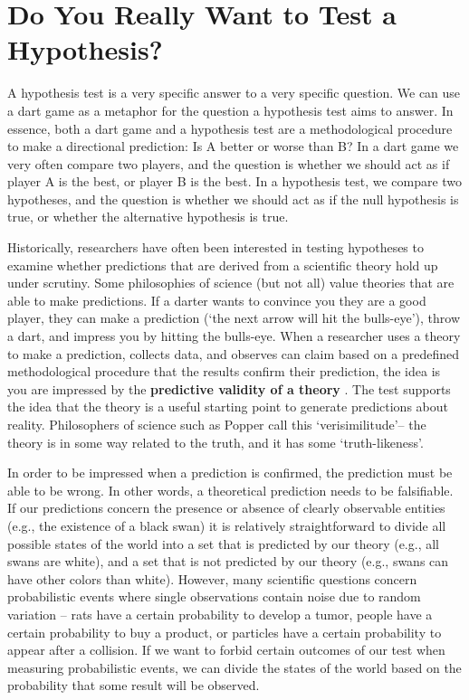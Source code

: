 \documentclass[
  oneside]{krantz}
\begin{document}
\hypertarget{do-you-really-want-to-test-a-hypothesis}{%
\section{Do You Really Want to Test a Hypothesis?}\label{do-you-really-want-to-test-a-hypothesis}}

A hypothesis test is a very specific answer to a very specific question. We can use a dart game as a metaphor for the question a hypothesis test aims to answer. In essence, both a dart game and a hypothesis test are a methodological procedure to make a directional prediction: Is A better or worse than B? In a dart game we very often compare two players, and the question is whether we should act as if player A is the best, or player B is the best. In a hypothesis test, we compare two hypotheses, and the question is whether we should act as if the null hypothesis is true, or whether the alternative hypothesis is true.

Historically, researchers have often been interested in testing hypotheses to examine whether predictions that are derived from a scientific theory hold up under scrutiny. Some philosophies of science (but not all) value theories that are able to make predictions. If a darter wants to convince you they are a good player, they can make a prediction (`the next arrow will hit the bulls-eye'), throw a dart, and impress you by hitting the bulls-eye. When a researcher uses a theory to make a prediction, collects data, and observes can claim based on a predefined methodological procedure that the results confirm their prediction, the idea is you are impressed by the \textbf{predictive validity of a theory} \citep{de_groot_methodology_1969}. The test supports the idea that the theory is a useful starting point to generate predictions about reality. Philosophers of science such as Popper call this `verisimilitude'-- the theory is in some way related to the truth, and it has some `truth-likeness'.

In order to be impressed when a prediction is confirmed, the prediction must be able to be wrong. In other words, a theoretical prediction needs to be falsifiable. If our predictions concern the presence or absence of clearly observable entities (e.g., the existence of a black swan) it is relatively straightforward to divide all possible states of the world into a set that is predicted by our theory (e.g., all swans are white), and a set that is not predicted by our theory (e.g., swans can have other colors than white). However, many scientific questions concern probabilistic events where single observations contain noise due to random variation -- rats have a certain probability to develop a tumor, people have a certain probability to buy a product, or particles have a certain probability to appear after a collision. If we want to forbid certain outcomes of our test when measuring probabilistic events, we can divide the states of the world based on the probability that some result will be observed.
\end{document}

